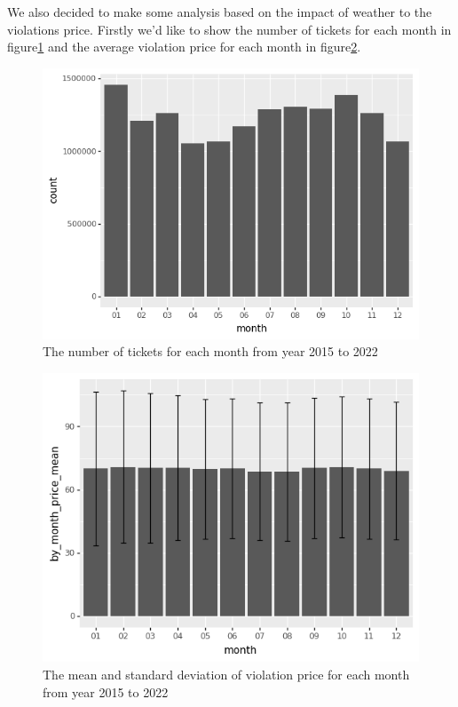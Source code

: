 \documentclass[12pt]{fphw}
\begin{document}
We also decided to make some analysis based on the impact of weather to the violations price.
Firstly we'd like to show the number of tickets for each month in figure\ref{fig:month_c} and the average violation price for each month in figure\ref{fig:month_p}.

\begin{figure}[h!]
  \label{fig:month_c}
  \includegraphics[width=1\textwidth]{figures2/Month_count.png}
  \caption{The number of tickets for each month from year 2015 to 2022}
\end{figure}

\begin{figure}[h!]
  \label{fig:month_p}
  \includegraphics[width=1\textwidth]{figures2/Month_price.png}
  \caption{The mean and standard deviation of violation price for each month from year 2015 to 2022}
\end{figure}
\end{document}
